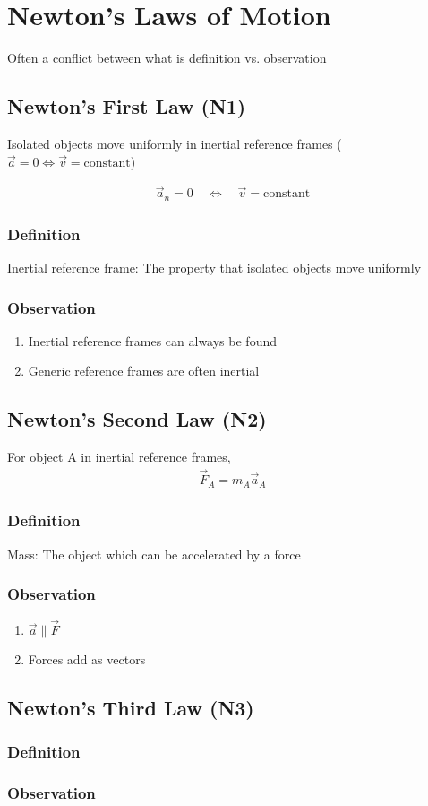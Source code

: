 \documentclass{notes}
\begin{document}
\section{Newton's Laws of Motion}
Often a conflict between what is definition vs. observation

\subsection{Newton's First Law (N1)}
\label{N1}
Isolated objects move uniformly in inertial reference frames (\(\vec{a} = 0 \Leftrightarrow \vec{v} = \text{constant}\))

\begin{gather}
    \vec{a}_n = 0 \quad \Leftrightarrow \quad \vec{v} = \text{constant}
\end{gather}

\subsubsection*{Definition}
Inertial reference frame: The property that isolated objects move uniformly

\subsubsection*{Observation}
\begin{enumerate}
    \item Inertial reference frames can always be found
    \item Generic reference frames are often inertial
\end{enumerate}

\subsection{Newton's Second Law (N2)}
\label{N2}
For object A in inertial reference frames,
\begin{gather}
    \vec{F}_A = m_A \vec{a}_A
\end{gather}

\subsubsection*{Definition}
Mass: The object which can be accelerated by a force

\subsubsection*{Observation}
\begin{enumerate}
    \item \(\vec{a} \parallel \vec{F}\)
    \item Forces add as vectors
\end{enumerate}

\subsection{Newton's Third Law (N3)}


\subsubsection*{Definition}


\subsubsection*{Observation}
\end{document}
